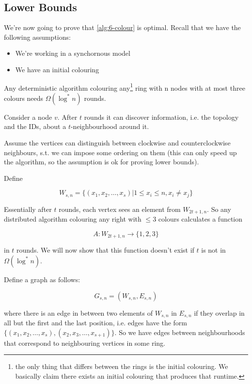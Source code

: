 \subsection{Lower Bounds}

We're now going to prove that \ref{alg:6-colour} is optimal. Recall that we have the following assumptions:

\begin{itemize}
\item We're working in a synchornous model
\item We have an initial colouring
\end{itemize}

\begin{thm}\label{thm:ring_colour_lowerbound} Any deterministic algorithm colouring any\footnote{the only thing that differs between the rings is the initial colouring. We basically claim there exists an initial colouring that produces that runtime.} ring with n nodes with at most three colours needs $\Omega(\log^* n)$ rounds.
\end{thm}

Consider a node $v$. After $t$ rounds it can discover information, i.e. the topology and the IDs, about a $t$-neighbourhood around it.

Assume the vertices can distinguish between clockwise and counterclockwise neighbours, s.t. we can impose some ordering on them (this can only speed up the algorithm, so the assumption is ok for proving lower bounds).

Define

\[W_{s,n} = \{(x_1,x_2,\ldots,x_s) | 1 \leq x_i\leq n, x_i\neq x_j\}\]

Essentially after $t$ rounds, each vertex sees an element from $W_{2t+1,n}$. So any distributed algorithm colouring any right with $\leq 3$ colours calculates a function

\[A:W_{2t+1,n} \longrightarrow \{1,2,3\}\]

in $t$ rounds. We will now show that this function doesn't exist if $t$ is not in $\Omega(\log^*n)$.

Define a graph as follows:

\[G_{s,n} = (W_{s,n},E_{s,n})\]

where there is an edge in between two elements of $W_{s,n}$ in $E_{s,n}$ if they overlap in all but the first and the last position, i.e. edges have the form $\{(x_1,x_2,\ldots,x_s),(x_2,x_3,\ldots,x_{s+1})\}$. So we have edges between neighbourhoods that correspond to neighbouring vertices in some ring.

